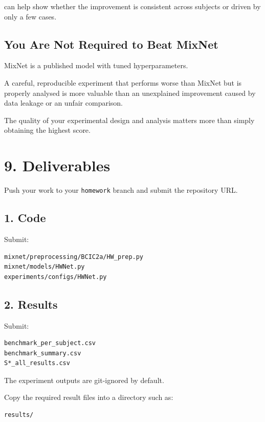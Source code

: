 \documentclass[
  10pt,
]{article}
\begin{document}
can help show whether the improvement is consistent across subjects or
driven by only a few cases.

\subsection{You Are Not Required to Beat
MixNet}\label{you-are-not-required-to-beat-mixnet}

MixNet is a published model with tuned hyperparameters.

A careful, reproducible experiment that performs worse than MixNet but
is properly analysed is more valuable than an unexplained improvement
caused by data leakage or an unfair comparison.

The quality of your experimental design and analysis matters more than
simply obtaining the highest score.

\section{9. Deliverables}\label{deliverables}

Push your work to your \texttt{homework} branch and submit the
repository URL.

\subsection{1. Code}\label{code}

Submit:

\begin{verbatim}
mixnet/preprocessing/BCIC2a/HW_prep.py
mixnet/models/HWNet.py
experiments/configs/HWNet.py
\end{verbatim}

\subsection{2. Results}\label{results}

Submit:

\begin{verbatim}
benchmark_per_subject.csv
benchmark_summary.csv
S*_all_results.csv
\end{verbatim}

The experiment outputs are git-ignored by default.

Copy the required result files into a directory such as:

\begin{verbatim}
results/
\end{verbatim}
\end{document}
